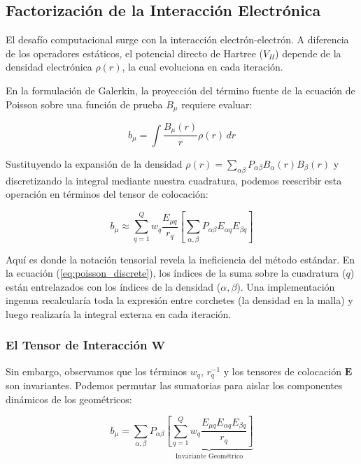 \subsection{Factorización de la Interacción Electrónica}

El desafío computacional surge con la interacción electrón-electrón. A diferencia de los operadores estáticos, el potencial directo de Hartree (\( V_H \)) depende de la densidad electrónica \( \rho(r) \), la cual evoluciona en cada iteración.

En la formulación de Galerkin, la proyección del término fuente de la ecuación de Poisson sobre una función de prueba \( B_\mu \) requiere evaluar:

\begin{equation}
\label{eq:poisson_continuous}
b_\mu = \int \frac{B_\mu(r)}{r} \rho(r) \, dr
\end{equation}

Sustituyendo la expansión de la densidad \( \rho(r) = \sum_{\alpha \beta} P_{\alpha \beta} B_\alpha(r) B_\beta(r) \) y discretizando la integral mediante nuestra cuadratura, podemos reescribir esta operación en términos del tensor de colocación:

\begin{equation}
\label{eq:poisson_discrete}
b_\mu \approx \sum_{q=1}^Q w_q \frac{E_{\mu q}}{r_q} \left[ \sum_{\alpha, \beta} P_{\alpha \beta} E_{\alpha q} E_{\beta q} \right]
\end{equation}

Aquí es donde la notación tensorial revela la ineficiencia del método estándar. En la ecuación (\ref{eq:poisson_discrete}), los índices de la suma sobre la cuadratura (\( q \)) están entrelazados con los índices de la densidad (\( \alpha, \beta \)). Una implementación ingenua recalcularía toda la expresión entre corchetes (la densidad en la malla) y luego realizaría la integral externa en cada iteración.

\subsubsection{El Tensor de Interacción \( \mathbf{W} \)}

Sin embargo, observamos que los términos \( w_q \), \( r_q^{-1} \) y los tensores de colocación \( \bm{E} \) son invariantes. Podemos permutar las sumatorias para aislar los componentes dinámicos de los geométricos:

\begin{equation}
b_\mu = \sum_{\alpha, \beta} P_{\alpha \beta} \underbrace{ \left[ \sum_{q=1}^Q w_q \frac{E_{\mu q} E_{\alpha q} E_{\beta q}}{r_q} \right] }_{\text{Invariante Geométrico}}
\end{equation}

